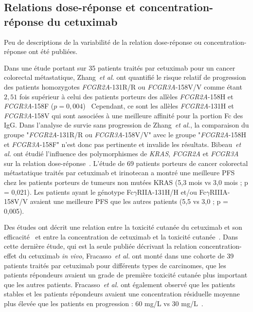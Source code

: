 \subsection{Relations dose-réponse et concentration-réponse du cetuximab}
Peu de descriptions de la variabilité de la relation dose-réponse ou concentration-réponse ont été publiées.

Dans une étude portant sur 35 patients traités par cetuximab pour un cancer colorectal métastatique, Zhang~\textit{et al.} ont quantifié le risque relatif de progression des patients homozygotes \textit{FCGR2A}-131R/R ou \textit{FCGR3A}-158V/V comme étant $2,51$ fois supérieur à celui des patients porteurs des allèles \textit{FCGR2A}-158H et \textit{FCGR3A}-158F ($p = 0,004$)~\citep{REF130} Cependant, ce sont les allèles \textit{FCGR2A}-131H et \textit{FCGR3A}-158V qui sont associées à une meilleure affinité pour la portion Fc des IgG. Dans l'analyse de survie sans progression de Zhang~\textit{et al.}, la comparaison du groupe "\textit{FCGR2A}-131R/R ou \textit{FCGR3A}-158V/V" avec le groupe "\textit{FCGR2A}-158H et \textit{FCGR3A}-158F" n'est donc pas pertinente et invalide les résultats. Bibeau~\textit{et al.} ont étudié l'influence des polymorphismes de \textit{KRAS}, \textit{FCGR2A} et \textit{FCGR3A} sur la relation dose-réponse~\citep{REF131}. L'étude de 69 patients porteurs de cancer colorectal métastatique traités par cetuximab et irinotecan a montré une meilleure PFS chez les patients porteurs de tumeurs non mutées KRAS (5,3 mois vs 3,0 mois ; p = 0,021). Les patients ayant le génotype Fc$\gamma$RIIA-131H/H et/ou Fc$\gamma$RIIIA-158V/V avaient une meilleure PFS que les autres patients (5,5 vs 3,0 ; p = 0,005).

Des études ont décrit une relation entre la toxicité cutanée du cetuximab et son efficacité~\citep{REF132} et entre la concentration de cetuximab et la toxicité cutanée~\citep{REF122}. Dans cette dernière étude, qui est la seule publiée décrivant la relation concentration-effet du cetuximab \textit{in vivo}, Fracasso~\textit{et al.} ont monté dans une cohorte de 39 patients traités par cetuximab pour différents types de carcinomes, que les patients répondeurs avaient un grade de première toxicité cutanée plus important que les autres patients. Fracasso~\textit{et al.} ont également observé que les patients stables et les patients répondeurs avaient une concentration résiduelle moyenne plus élevée que les patients en progression : 60 mg/L vs 30 mg/L~\citep{REF122}.
